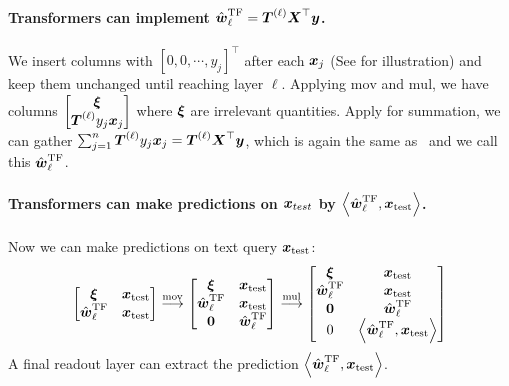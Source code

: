 \paragraph{Transformers can implement $\hat{\boldsymbol{w}}_\ell^\mathrm{TF} = \boldsymbol{T}^{(\ell)} \boldsymbol{X}^\top \boldsymbol{y}$.}
We insert columns with $[0, 0, \cdots, y_j]^\top$ after each $\boldsymbol{x}_j$ (See  for illustration) and keep them unchanged until reaching layer $\ell$. Applying $\mathrm{mov}$ and $\mathrm{mul}$, we have columns $\begin{bmatrix}
    \boldsymbol{\xi} \\ \boldsymbol{T}^{(\ell)} y_j \boldsymbol{x}_j
\end{bmatrix}$ where $\boldsymbol{\xi}$ are irrelevant quantities. Apply  for summation, we can gather $\sum_{j=1}^n \boldsymbol{T}^{(\ell)} y_j \boldsymbol{x}_j = \boldsymbol{T}^{(\ell)} \boldsymbol{X}^\top \boldsymbol{y}$, which is again the same as \newton\ and we call this $\hat{\boldsymbol{w}}_\ell^\mathrm{TF}$. 

\paragraph{Transformers can make predictions on $\boldsymbol{x}_{test}$ by $\left\langle {\hat{\boldsymbol{w}}_\ell^\mathrm{TF}, \boldsymbol{x}_\mathrm{test}} \right\rangle$.} 

Now we can make predictions on text query $\boldsymbol{x}_\mathrm{test}$:
\begin{equation}
    \begin{bmatrix}
        \boldsymbol{\xi} &  \boldsymbol{x}_\mathrm{test} \\
        \hat{\boldsymbol{w}}_\ell^\mathrm{TF} & \boldsymbol{x}_\mathrm{test}
    \end{bmatrix} \overset{\mathrm{mov}}{\longrightarrow} \begin{bmatrix}
        \boldsymbol{\xi} &  \boldsymbol{x}_\mathrm{test} \\
        \hat{\boldsymbol{w}}_\ell^\mathrm{TF} & \boldsymbol{x}_\mathrm{test} \\
        \boldsymbol{0} & \hat{\boldsymbol{w}}_\ell^\mathrm{TF}
    \end{bmatrix} \overset{\mathrm{mul}}{\longrightarrow} \begin{bmatrix}
        \boldsymbol{\xi} &  \boldsymbol{x}_\mathrm{test} \\
        \hat{\boldsymbol{w}}_\ell^\mathrm{TF} & \boldsymbol{x}_\mathrm{test} \\
        \boldsymbol{0} & \hat{\boldsymbol{w}}_\ell^\mathrm{TF} \\
        0 & \left\langle {\hat{\boldsymbol{w}}_\ell^\mathrm{TF}, \boldsymbol{x}_\mathrm{test}} \right\rangle
    \end{bmatrix}
\end{equation}
A final readout layer can extract the prediction $\left\langle {\hat{\boldsymbol{w}}_\ell^\mathrm{TF}, \boldsymbol{x}_\mathrm{test}} \right\rangle$.

